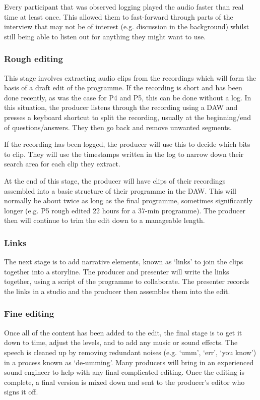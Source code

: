 Every participant that was observed logging played the audio faster than real
time at least once. This allowed them to fast-forward through parts of the
interview that may not be of interest (e.g. discussion in the background)
whilst still being able to listen out for anything they might want to use.

\subsubsection{Rough editing}
This stage involves extracting audio clips from the recordings which will form
the basis of a draft edit of the programme. If the recording is short and has
been done recently, as was the case for P4 and P5, this can be done without a
log. In this situation, the producer listens through the recording using a DAW
and presses a keyboard shortcut to split the recording, usually at the
beginning/end of questions/answers. They then go back and remove unwanted
segments.

If the recording has been logged, the producer will use this to decide which
bits to clip. They will use the timestamps written in the log to narrow down
their search area for each clip they extract.

At the end of this stage, the producer will have clips of their recordings
assembled into a basic structure of their programme in the DAW. This will
normally be about twice as long as the final programme, sometimes significantly
longer (e.g. P5 rough edited 22 hours for a 37-min programme). The producer
then will continue to trim the edit down to a manageable length.

\subsubsection{Links}
The next stage is to add narrative elements, known as `links' to join the clips
together into a storyline. The producer and presenter will write the links
together, using a script of the programme to collaborate. The presenter records
the links in a studio and the producer then assembles them into the edit.

\subsubsection{Fine editing}
Once all of the content has been added to the edit, the final stage is to get
it down to time, adjust the levels, and to add any music or sound effects. The
speech is cleaned up by removing redundant noises (e.g.  `umm', `err', `you
know') in a process known as `de-umming'. Many producers will bring in an
experienced sound engineer to help with any final complicated editing.
Once the editing is complete, a final version is mixed down and sent to the
producer's editor who signs it off.

